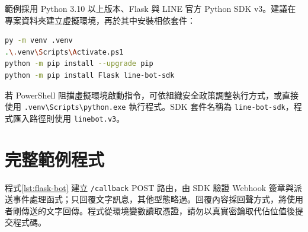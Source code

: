 \documentclass[a4paper,12pt]{report}
\begin{document}
範例採用 Python 3.10 以上版本、Flask 與 LINE 官方 Python SDK v3。建議在專案資料夾建立虛擬環境，再於其中安裝相依套件：
\begin{lstlisting}[language=bash,caption={建立 Python 虛擬環境並安裝範例套件},label={lst:install}]
py -m venv .venv
.\.venv\Scripts\Activate.ps1
python -m pip install --upgrade pip
python -m pip install Flask line-bot-sdk
\end{lstlisting}

若 PowerShell 阻擋虛擬環境啟動指令，可依組織安全政策調整執行方式，或直接使用 \texttt{.venv\textbackslash Scripts\textbackslash python.exe} 執行程式。SDK 套件名稱為 \texttt{line-bot-sdk}，程式匯入路徑則使用 \texttt{linebot.v3}。

\section{完整範例程式}

程式\ref{lst:flask-bot} 建立 \texttt{/callback} POST 路由，由 SDK 驗證 Webhook 簽章與派送事件處理函式；只回覆文字訊息，其他型態略過。回覆內容採回聲方式，將使用者剛傳送的文字回傳。程式從環境變數讀取憑證，請勿以真實密鑰取代佔位值後提交程式碼。
\end{document}
